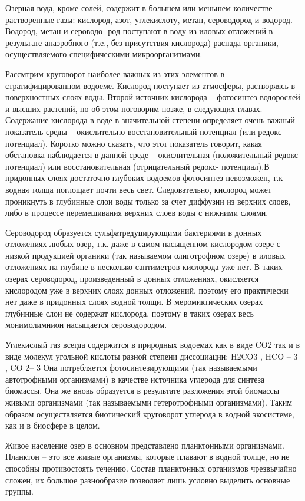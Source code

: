 Озерная вода, кроме солей, содержит в большем или меньшем количестве растворенные
газы: кислород, азот, углекислоту, метан, сероводород и водород. Водород, метан и сероводо-
род поступают в воду из иловых отложений в результате анаэробного (т.е., без присутствия
кислорода) распада органики, осуществляемого специфическими микроорганизмами.

Рассмтрим круговорот наиболее важных из этих элементов в стратифицированном водоеме. Кислород поступает из атмосферы, растворяясь в поверхностных слоях воды. Второй
источник кислорода – фотосинтез водорослей и высших растений, но об этом поговорим
позже, в следующих главах. Содержание кислорода в воде в значительной степени определяет очень важный показатель среды – окислительно-восстановительный потенциал (или
редокс-потенциал). Коротко можно сказать, что этот показатель говорит, какая обстановка
наблюдается в данной среде – окислительная (положительный редокс-потенциал) или восстановительная (отрицательный редокс- потенциал).В придонных слоях достаточно глубоких
водоемов фотосинтез невозможен, т.к водная толща поглощает почти весь свет. Следовательно, кислород может проникнуть в глубинные слои воды только за счет диффузии из верхних
слоев, либо в процессе перемешивания верхних слоев воды с нижними слоями.

Сероводород образуется сульфатредуцирующими бактериями в донных отложениях любых озер, т.к. даже в самом насыщенном кислородом озере с низкой продукцией органики
(так называемом олиготрофном озере) в иловых отложениях на глубине в несколько сантиметров кислорода уже нет. В таких озерах сероводород, произведенный в донных отложениях, окисляется кислородом уже в верхних слоях донных отложений, поэтому его практически
нет даже в придонных слоях водной толщи. В меромиктических озерах глубинные слои не
содержат кислорода, поэтому в таких озерах весь монимолимнион насыщается сероводородом.

Углекислый газ всегда содержится в природных водоемах как в виде CO2
так и в виде
молекул угольной кислоты разной степени диссоциации: H2CO3
, HCO –
3
, CO 2–
3 Она потребляется фотосинтезирующими (так называемыми автотрофными организмами) в качестве
источника углерода для синтеза биомассы. Она же вновь образуется в результате разложения этой биомассы живыми организмами (так называемыми гетеротрофными организмами).
Таким образом осуществляется биотический круговорот углерода в водной экосистеме, как
и в биосфере в целом.

Живое население озер в основном представлено планктонными организмами. Планктон –
это все живые организмы, которые плавают в водной толще, но не способны противостоять
течению. Состав планктонных организмов чрезвычайно сложен, их большое разнообразие
позволяет лишь условно выделить основные группы.

